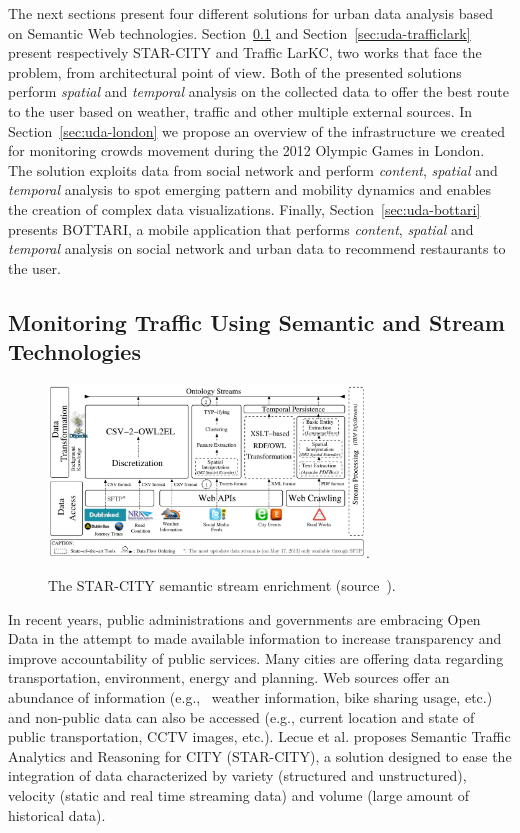 The next sections present four different solutions for urban data analysis based on Semantic Web technologies.
Section~\ref{sec:uda-starcity} and Section~\ref{sec:uda-trafficlark} present respectively STAR-CITY and Traffic LarKC, two works that face the problem, from architectural point of view. Both of the presented solutions perform \textit{spatial} and \textit{temporal} analysis on the collected data to offer the best route to the user based on weather, traffic and other multiple external sources.
In Section~\ref{sec:uda-london} we propose an overview of the infrastructure we created for monitoring crowds movement during the 2012 Olympic Games in London. The solution exploits data from social network and perform \textit{content}, \textit{spatial} and \textit{temporal} analysis to spot emerging pattern and mobility dynamics and enables the creation of complex data visualizations.
Finally, Section~\ref{sec:uda-bottari} presents BOTTARI, a mobile application that performs \textit{content}, \textit{spatial} and \textit{temporal} analysis on social network and urban data to recommend restaurants to the user.

\subsection{Monitoring Traffic Using Semantic and Stream Technologies} \label{sec:uda-starcity}

\begin{figure}[t]
	\centering
	\includegraphics[width=0.75\textwidth]{img/starcity}.
    \caption{The STAR-CITY semantic stream enrichment (source~\cite{DBLP:journals/ws/LecueTHTBST14}).}
    \label{fig:star-city}
\end{figure}

In recent years, public administrations and governments are embracing Open Data in the attempt to made available information to increase transparency and improve accountability of public services. Many cities are offering data regarding transportation, environment, energy and planning. Web sources offer an abundance of information (e.g., ~weather information, bike sharing usage, etc.) and non-public data can also be accessed (e.g., current location and state of public transportation, CCTV images, etc.).
Lecue et al.\cite{DBLP:journals/ws/LecueTHTBST14} proposes Semantic Traffic Analytics and Reasoning for CITY (STAR-CITY), a solution designed to ease the integration of data characterized by variety (structured and unstructured), velocity (static and real time streaming data) and volume (large amount of historical data).

